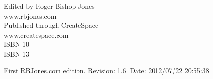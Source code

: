 \begin{titlepage}
\maketitle


\vfill

\begin{centering}




\vfill

\vspace{0.1in}
Edited by Roger Bishop Jones\\
www.rbjones.com\\
\vspace{0.1in}
Published through CreateSpace\\
www.createspace.com\\
\vspace{0.2in}
ISBN-10\\
ISBN-13\\
\vspace{0.2in}

{\footnotesize



First RBJones.com edition. $ $Revision: 1.6 $~$Date: 2012/07/22 20:55:38 $ $


}%

\end{centering}


\thispagestyle{empty}
\end{titlepage}

{\parskip=0pt\tableofcontents}

